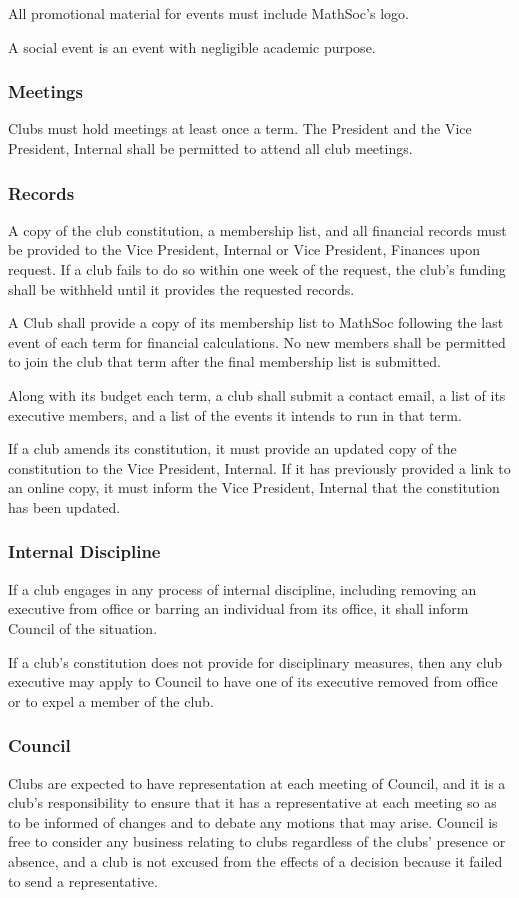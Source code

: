 All promotional material for events must include MathSoc's logo.

A social event is an event with negligible academic purpose.

\subsubsection{Meetings}
Clubs must hold meetings at least once a term. The President and the Vice
President, Internal shall be permitted to attend all club meetings.

\subsubsection{Records}
A copy of the club constitution, a membership list, and all financial records
must be provided to the Vice President, Internal or Vice President, Finances
upon request. If a club fails to do so within one week of the request, the
club's funding shall be withheld until it provides the requested records.

A Club shall provide a copy of its membership list to MathSoc following the
last event of each term for financial calculations. No new members shall be
permitted to join the club that term after the final membership list is
submitted.

Along with its budget each term, a club shall submit a contact email, a list of
its executive members, and a list of the events it intends to run in that term.

If a club amends its constitution, it must provide an updated copy of the
constitution to the Vice President, Internal. If it has previously provided a
link to an online copy, it must inform the Vice President, Internal that the
constitution has been updated.

\subsubsection{Internal Discipline}
If a club engages in any process of internal discipline, including removing an
executive from office or barring an individual from its office, it shall inform
Council of the situation.

If a club's constitution does not provide for disciplinary measures, then any
club executive may apply to Council to have one of its executive removed from
office or to expel a member of the club.

\subsubsection{Council}
Clubs are expected to have representation at each meeting of Council, and it is
a club's responsibility to ensure that it has a representative at each meeting
so as to be informed of changes and to debate any motions that may arise.
Council is free to consider any business relating to clubs regardless of the
clubs' presence or absence, and a club is not excused from the effects of a
decision because it failed to send a representative.

